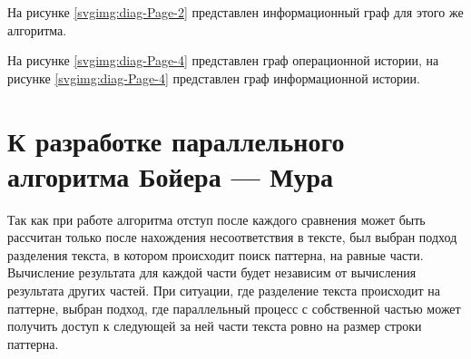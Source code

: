 На рисунке \ref{svgimg:diag-Page-2} представлен информационный граф для этого же алгоритма.

На рисунке \ref{svgimg:diag-Page-4} представлен граф операционной истории, на рисунке \ref{svgimg:diag-Page-4} представлен граф информационной истории.
\newpage
{}
\newpage
{}
\newpage
{}
\newpage
\section{К разработке параллельного алгоритма Бойера --- Мура}
Так как при работе алгоритма отступ после каждого сравнения может быть рассчитан только после нахождения несоответствия в тексте, был выбран подход разделения текста, в котором происходит поиск паттерна, на равные части. 
Вычисление результата для каждой части будет независим от вычисления результата других частей. При ситуации, где разделение текста происходит на паттерне, выбран подход, где параллельный процесс с собственной частью может получить доступ к следующей за ней части текста ровно на размер строки паттерна.